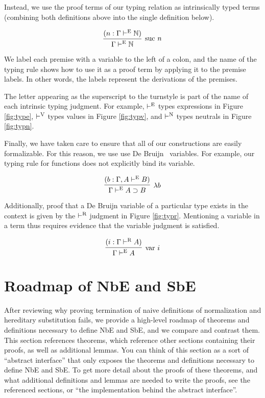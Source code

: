 \documentclass{llncs}
\newcommand{\reffig}[1]{Figure \ref{fig:#1}}
\def\arr{\supset}
\def\lam{\lambda}
\def\nat{\mathbb{N}}
\newcommand{\turn}[1]{\vdash^\con{#1}}
\newcommand{\con}[1]{\textmd{#1}}
\newcommand{\fun}[1]{\textmd{#1}}
\newcommand{\type}[1]{\Gamma \turn{E} #1}
\newcommand{\ctype}[2]{\Gamma , #1 \turn{E} #2}
\newcommand{\typr}[1]{\Gamma \turn{R} #1}
\begin{document}
Instead, we use the proof terms of our typing relation as
intrinsically typed terms (combining both definitions above into the
single definition below).

$$
\infer
  [\con{suc} ~ n]
  {\type{\nat}}
{
  (n : \type{\nat})
}
$$

We label each premise with a variable to
the left of a colon, and the name of the typing rule shows how to use
it as a proof term by applying it to the premise labels. In other
words, the labels represent the derivations of the premises.

The letter appearing as the superscript to the turnstyle is part of
the name of each intrinsic typing judgment. For example, $\turn{E}$
types expressions in \reffig{type}, $\turn{V}$ types values in
\reffig{typv}, and $\turn{N}$ types neutrals in \reffig{typn}.

Finally, we have taken care to ensure that all of our constructions
are easily formalizable. For this reason, we
use use De Bruijn~\cite{TODO} variables. For example, our typing rule
for functions does not explicitly bind its variable.

$$
\infer
  [\lam b]
  {\type{A \arr B}}
{
  (b : \ctype{A}{B})
}
$$

Additionally, proof that a De Bruijn variable of a particular type
exists in the context is given by the $\turn{R}$ judgment in
\reffig{typr}. Mentioning a variable in a term thus requires evidence
that the variable judgment is satisfied.

$$
\infer
  [\fun{var} ~ i]
  {\type{A}}
{
  (i : \typr{A})
}
$$

\section{Roadmap of NbE and SbE}
\label{sec:road}

After reviewing why proving termination of naive definitions of
normalization and hereditary substitution fails, we provide a
high-level roadmap of theorems and definitions necessary to define NbE
and SbE, and we compare and contrast them. This section references
theorems, which reference other sections containing their proofs, as
well as additional lemmas. You can think of this section as a sort of
``abstract interface'' that only exposes the theorems and definitions
necessary to define NbE and SbE. To get more detail about the proofs
of these theorems, and what additional definitions and lemmas are
needed to write the proofs, see the referenced sections, or
``the implementation behind the abstract interface''.
\end{document}
